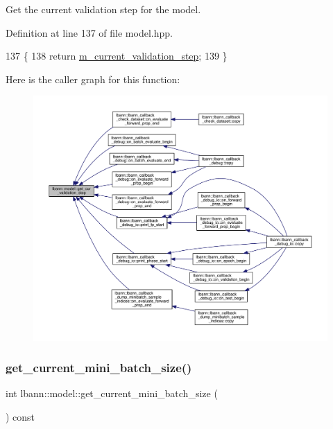 Get the current validation step for the model. 

Definition at line 137 of file model.\+hpp.


\begin{DoxyCode}
137                                              \{
138     \textcolor{keywordflow}{return} \hyperlink{classlbann_1_1model_af69e5f6bf49a4990fd4c18984705ab87}{m\_current\_validation\_step};
139   \}
\end{DoxyCode}
Here is the caller graph for this function\+:\nopagebreak
\begin{figure}[H]
\begin{center}
\leavevmode
\includegraphics[width=350pt]{classlbann_1_1model_a680ef8ecf644dbc821b5e7488d3bd2c4_icgraph}
\end{center}
\end{figure}
\mbox{\label{classlbann_1_1model_a3eaad8fd538b99ecab9afca6dc3327fd}} 
\subsubsection{\texorpdfstring{get\+\_\+current\+\_\+mini\+\_\+batch\+\_\+size()}{get\_current\_mini\_batch\_size()}}
{\footnotesize\ttfamily int lbann\+::model\+::get\+\_\+current\+\_\+mini\+\_\+batch\+\_\+size (\begin{DoxyParamCaption}{ }\end{DoxyParamCaption}) const\hspace{0.3cm}{\ttfamily [inline]}}

